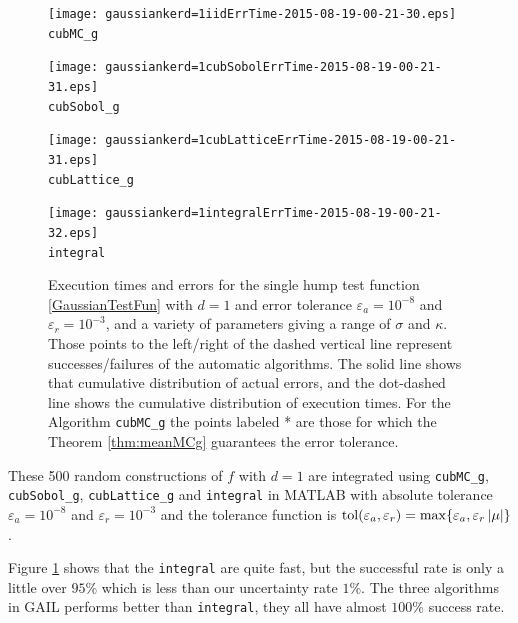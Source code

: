 \documentclass{iitthesis}
\begin{document}
\begin{figure}
\centering
\begin{minipage}{7cm} \centering \texttt{[image: gaussiankerd=1iidErrTime-2015-08-19-00-21-30.eps]} \\ {\tt cubMC\_g}  \end{minipage}
\begin{minipage}{7cm} \centering \texttt{[image: gaussiankerd=1cubSobolErrTime-2015-08-19-00-21-31.eps]} \\  {\tt cubSobol\_g}\end{minipage}
\begin{minipage}{7cm} \centering \texttt{[image: gaussiankerd=1cubLatticeErrTime-2015-08-19-00-21-31.eps]} \\ {\tt cubLattice\_g} \end{minipage}
\begin{minipage}{7cm} \centering \texttt{[image: gaussiankerd=1integralErrTime-2015-08-19-00-21-32.eps]} \\ {\tt integral } \end{minipage}
\caption{Execution times and errors for the single hump test function \eqref{GaussianTestFun} with $d=1$ and error tolerance $\varepsilon_a=10^{-8}$ and $\varepsilon_r=10^{-3}$, and a variety of parameters giving a range of $\sigma$ and $\kappa$. Those points to the left/right of the dashed vertical line represent successes/failures of the automatic algorithms.  The solid line shows that cumulative distribution of actual errors, and the dot-dashed line shows the cumulative distribution of execution times.  For the Algorithm {\tt cubMC\_g} the points labeled * are those for which the Theorem \ref{thm:meanMCg} guarantees the error tolerance.\label{fig:GaussiankerTestFun} }
\end{figure}

These 500 random constructions of $f$ with $d=1$ are integrated using  {\tt cubMC\_g}, {\tt cubSobol\_g}, {\tt cubLattice\_g} and {\tt integral} in MATLAB with absolute tolerance $\varepsilon_a = 10^{-8}$ and $\varepsilon_r=10^{-3}$ and the tolerance function is $\operatorname{tol}(\varepsilon_a, \varepsilon_r) = \max \{ \varepsilon_a, \varepsilon_r \left \lvert \mu \right \rvert\}$. 

Figure \ref{fig:GaussiankerTestFun} shows that the {\tt integral} are quite fast, but the successful rate is only a little over $95\%$ which is less than our uncertainty rate $1\%$. The three algorithms in GAIL performs better than {\tt integral}, they all have almost $100\%$ success rate.
\end{document}
